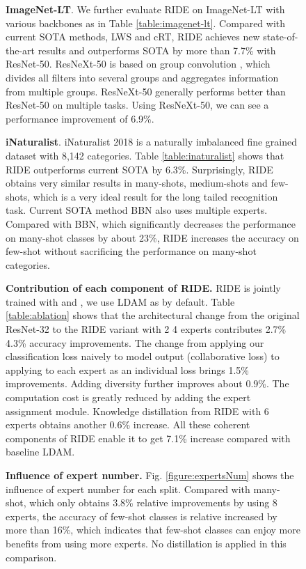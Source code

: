 \documentclass[dvipsnames]{article}
\begin{document}
{\begin{figure}[#1]

{\bf{ImageNet-LT}}. We further evaluate RIDE on ImageNet-LT with various backbones as in Table \ref{table:imagenet-lt}. Compared with current SOTA methods, LWS and cRT, RIDE achieves new state-of-the-art results and outperforms SOTA by more than 7.7\% with ResNet-50. ResNeXt-50 is based on group convolution \citep{xie2017aggregated}, which divides all filters into several groups and aggregates information from multiple groups. ResNeXt-50 generally performs better than ResNet-50 on multiple tasks. Using ResNeXt-50, we can see a performance improvement of 6.9\%.


{\bf{iNaturalist}}. iNaturalist 2018 is a naturally imbalanced fine grained dataset with 8,142 categories. Table \ref{table:inaturalist} shows that RIDE outperforms current SOTA by 6.3\%. Surprisingly, RIDE obtains very similar results in many-shots, medium-shots and few-shots, which is a very ideal result for the long tailed recognition task. Current SOTA method BBN also uses multiple experts. Compared with BBN, which significantly decreases the performance on many-shot classes by about 23\%, RIDE increases the accuracy on few-shot without sacrificing the performance on many-shot categories.

{\bf{Contribution of each component of RIDE.}} 
RIDE is jointly trained with  and , we use LDAM as  by default. Table \ref{table:ablation} shows that the architectural change from the original ResNet-32 to the RIDE variant with 2  4 experts contributes 2.7\%  4.3\% accuracy improvements. The change from applying our classification loss naively to model output (collaborative loss) to applying to each expert as an individual loss brings 1.5\% improvements. Adding diversity further improves about 0.9\%. The computation cost is greatly reduced by adding the expert assignment module. Knowledge distillation from RIDE with 6 experts obtains another 0.6\% increase. All these coherent components of RIDE enable it to get 7.1\% increase compared with baseline LDAM.

{\bf{Influence of expert number.}} Fig. \ref{figure:expertsNum} shows the influence of expert number for each split. Compared with many-shot, which only obtains 3.8\% relative improvements by using 8 experts, the accuracy of few-shot classes is relative increased by more than 16\%, which indicates that few-shot classes can enjoy more benefits from using more experts. No distillation is applied in this comparison.


\end{figure}}
\end{document}
